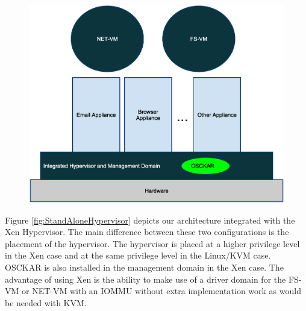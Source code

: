 \begin{figure}[tbp]
\begin{centering}
\label{fig:IntegratedHypervisor}
\includegraphics[scale=0.7,angle=90]{figs/IntegratedHypervisorArchitecture}
\end{centering}
\end{figure}

Figure \ref{fig:StandAloneHypervisor} depicts our architecture integrated with the Xen Hypervisor. The main difference between these two configurations is the placement of the hypervisor. The hypervisor is placed at a higher privilege level in the Xen case and at the same privilege level in the Linux/KVM case. OSCKAR is also installed in the management domain in the Xen case. The advantage of using Xen is the ability to make use of a driver domain for the FS-VM or NET-VM with an IOMMU without extra implementation work as would be needed with KVM.


